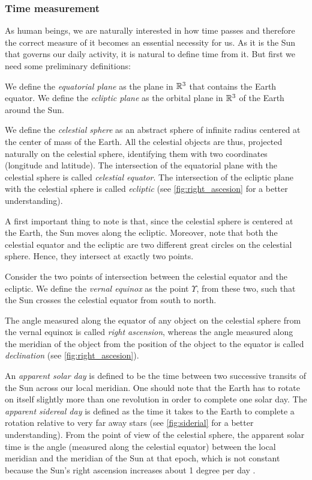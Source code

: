 \documentclass[../main.tex]{subfiles}
\begin{document}
\subsubsection{Time measurement}\label{sec:time_measurement}
As human beings, we are naturally interested in how time passes and therefore the correct measure of it becomes an essential necessity for us. As it is the Sun that governs our daily activity, it is natural to define time from it.
But first we need some preliminary definitions:
\begin{definition}
  We define the \emph{equatorial plane} as the plane in $\mathbb{R}^3$ that contains the Earth equator. We define the \emph{ecliptic plane} as the orbital plane in $\mathbb{R}^3$ of the Earth around the Sun.
\end{definition}
\begin{definition}
  We define the \emph{celestial sphere} as an abstract sphere of infinite radius centered at the center of mass of the Earth. All the celestial objects are thus, projected naturally on the celestial sphere, identifying them with two coordinates (longitude and latitude). The intersection of the equatorial plane with the celestial sphere is called \emph{celestial equator}. The intersection of the ecliptic plane with the celestial sphere is called \emph{ecliptic} (see \cref{fig:right_ascesion} for a better understanding).
\end{definition}
A first important thing to note is that, since the celestial sphere is centered at the Earth, the Sun moves along the ecliptic. Moreover, note that both the celestial equator and the ecliptic are two different great circles on the celestial sphere. Hence, they intersect at exactly two points.

\begin{definition}
  Consider the two points of intersection between the celestial equator and the ecliptic. We define the \emph{vernal equinox} as the point $\Upsilon$, from these two, such that the Sun crosses the celestial equator from south to north.
\end{definition}
The angle measured along the equator of any object on the celestial sphere from the vernal equinox is called \emph{right ascension}, whereas the angle measured along the meridian of the object from the position of the object to the equator is called \emph{declination} (see \cref{fig:right_ascesion}).

An \emph{apparent solar day} is defined to be the time between two successive transits of the Sun across our local meridian. One should note that the Earth has to rotate on itself slightly more than one revolution in order to complete one solar day. The \emph{apparent sidereal day} is defined as the time it takes to the Earth to complete a rotation relative to very far away stars (see \cref{fig:siderial} for a better understanding). From the point of view of the celestial sphere, the apparent solar time is the angle (measured along the celestial equator) between the local meridian and the meridian of the Sun at that epoch, which is not constant because the Sun's right ascension increases about 1 degree per day \cite{montenbruck}.
\end{document}
